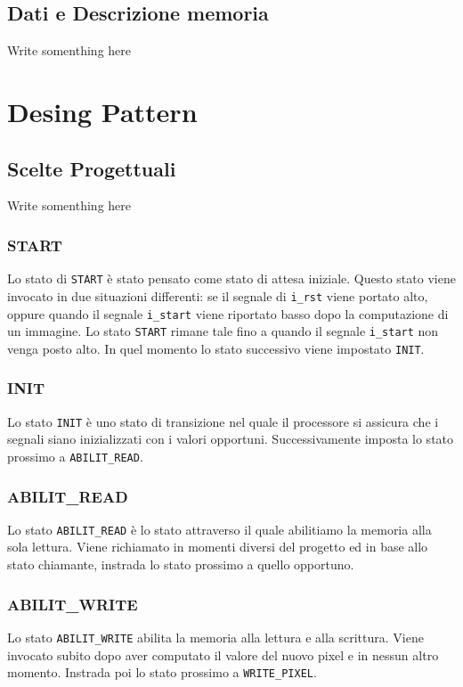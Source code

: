 \documentclass{article}
\begin{document}
\subsection{Dati e Descrizione memoria} %
Write somenthing here

\section{Desing Pattern} %
\subsection{Scelte Progettuali} %
Write somenthing here

\subsubsection{START} %
Lo stato di \texttt{START} è stato pensato come stato di attesa iniziale. Questo stato viene invocato in due situazioni differenti: se il segnale di \texttt{i\_rst} viene portato alto, oppure quando il segnale \texttt{i\_start} viene riportato basso dopo la computazione di un immagine. Lo stato \texttt{START} rimane tale fino a quando il segnale \texttt{i\_start} non venga posto alto. In quel momento lo stato successivo viene impostato \texttt{INIT}.

\subsubsection{INIT}%
Lo stato \texttt{INIT} è uno stato di transizione nel quale il processore si assicura che i segnali siano inizializzati con i valori opportuni. Successivamente imposta lo stato prossimo a \texttt{ABILIT\_READ}.

\subsubsection{ABILIT\_READ}%
Lo stato \texttt{ABILIT\_READ} è lo stato attraverso il quale abilitiamo la memoria alla sola lettura. Viene richiamato in momenti diversi del progetto ed in base allo stato chiamante, instrada lo stato prossimo a quello opportuno.

\subsubsection{ABILIT\_WRITE}%
Lo stato \texttt{ABILIT\_WRITE} abilita la memoria alla lettura e alla scrittura. Viene invocato subito dopo aver computato il valore del nuovo pixel e in nessun altro momento. Instrada poi lo stato prossimo a \texttt{WRITE\_PIXEL}.
\end{document}
